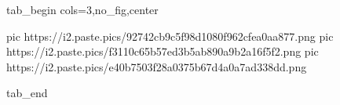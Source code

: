  
 
 
 
 


\ifcmt
  tab_begin cols=3,no_fig,center

     pic https://i2.paste.pics/92742cb9c5f98d1080f962cfea0aa877.png
		 pic https://i2.paste.pics/f3110c65b57ed3b5ab890a9b2a16f5f2.png
		 pic https://i2.paste.pics/e40b7503f28a0375b67d4a0a7ad338dd.png

  tab_end
\fi
